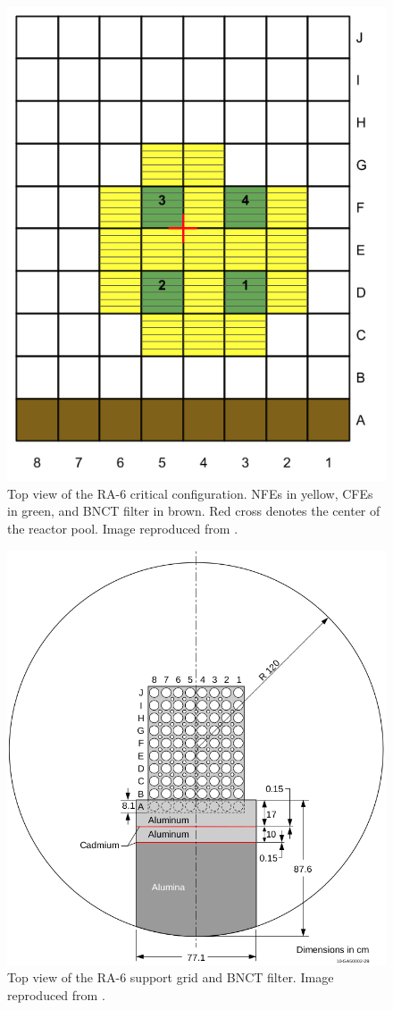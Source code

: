 \begin{figure}[htbp!] %
    \centering
    \includegraphics[width=0.50\linewidth]{figures/ra6-core2}
    \hfill
    \caption{Top view of the RA-6 critical configuration. NFEs in yellow, CFEs in green, and BNCT filter in brown. Red cross denotes the center of the reactor pool. Image reproduced from \cite{ICSBEP}.}
    \label{fig:ra6-1}
\end{figure}

\begin{figure}[htbp!] %
    \centering
    \includegraphics[width=0.65\linewidth]{figures/bnct}
    \hfill
    \caption{Top view of the RA-6 support grid and BNCT filter. Image reproduced from \cite{ICSBEP}.}
    \label{fig:ra6-2}
\end{figure}

